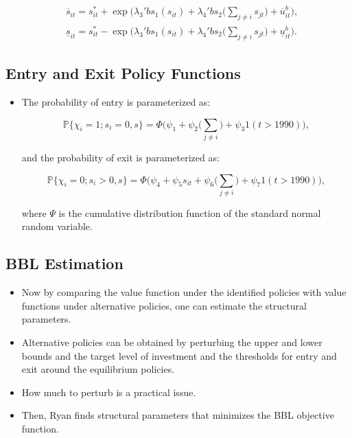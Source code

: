 \documentclass[]{book}
\providecommand{\tightlist}{%
  \setlength{\itemsep}{0pt}\setlength{\parskip}{0pt}}
\begin{document}
\begin{equation}
\begin{split}
&\overline{s}_{it} = s_{it}^* + \exp\Bigg(\lambda_3' bs_1(s_{it}) + \lambda_4' bs_2\Bigg(\sum_{j \neq i} s_{jt} \Bigg) + \overline{u}_{it}^b \Bigg),\\
&\underline{s}_{it} = s_{it}^* - \exp\Bigg(\lambda_3' bs_1(s_{it}) + \lambda_4' bs_2\Bigg(\sum_{j \neq i} s_{jt} \Bigg) + \underline{u}_{it}^b \Bigg).
\end{split}
\end{equation}

\subsection{Entry and Exit Policy
Functions}\label{entry-and-exit-policy-functions}

\begin{itemize}
\tightlist
\item
  The probability of entry is parameterized as:

  \begin{equation}
  \mathbb{P}\{\chi_i = 1; s_i = 0, s\} = \Phi\Bigg(\psi_1 + \psi_2\Bigg(\sum_{j \neq i}\Bigg) + \psi_3 1(t > 1990) \Bigg),
  \end{equation}

  and the probability of exit is parameterized as:

  \begin{equation}
  \mathbb{P}\{\chi_i = 0; s_i > 0, s\} = \Phi\Bigg(\psi_4 + \psi_5 s_{it} + \psi_6 \Bigg(\sum_{j \neq i}\Bigg) + \psi_7 1(t > 1990) \Bigg),
  \end{equation}

  where \(\Psi\) is the cumulative distribution function of the standard
  normal random variable.
\end{itemize}

\subsection{BBL Estimation}\label{bbl-estimation}

\begin{itemize}
\tightlist
\item
  Now by comparing the value function under the identified policies with
  value functions under alternative policies, one can estimate the
  structural parameters.
\item
  Alternative policies can be obtained by perturbing the upper and lower
  bounds and the target level of investment and the thresholds for entry
  and exit around the equilibrium policies.
\item
  How much to perturb is a practical issue.
\item
  Then, Ryan finds structural parameters that minimizes the BBL
  objective function.
\end{itemize}
\end{document}
